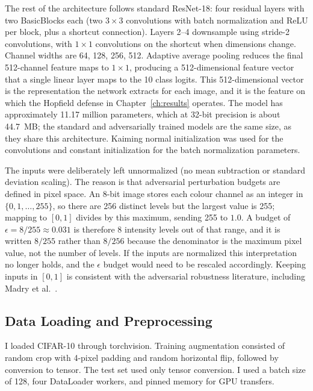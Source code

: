 The rest of the architecture follows standard ResNet-18: four residual layers with two BasicBlocks each (two $3 \times 3$ convolutions with batch normalization and ReLU per block, plus a shortcut connection). Layers 2--4 downsample using stride-2 convolutions, with $1 \times 1$ convolutions on the shortcut when dimensions change. Channel widths are 64, 128, 256, 512. Adaptive average pooling reduces the final 512-channel feature maps to $1 \times 1$, producing a 512-dimensional feature vector that a single linear layer maps to the 10 class logits. This 512-dimensional vector is the representation the network extracts for each image, and it is the feature on which the Hopfield defense in Chapter~\ref{ch:results} operates. The model has approximately 11.17 million parameters, which at 32-bit precision is about 44.7~MB; the standard and adversarially trained models are the same size, as they share this architecture. Kaiming normal initialization was used for the convolutions and constant initialization for the batch normalization parameters.

The inputs were deliberately left unnormalized (no mean subtraction or standard deviation scaling). The reason is that adversarial perturbation budgets are defined in pixel space. An 8-bit image stores each colour channel as an integer in $\{0, 1, \dots, 255\}$, so there are 256 distinct levels but the largest value is 255; mapping to $[0, 1]$ divides by this maximum, sending 255 to $1.0$. A budget of $\epsilon = 8/255 \approx 0.031$ is therefore 8 intensity levels out of that range, and it is written $8/255$ rather than $8/256$ because the denominator is the maximum pixel value, not the number of levels. If the inputs are normalized this interpretation no longer holds, and the $\epsilon$ budget would need to be rescaled accordingly. Keeping inputs in $[0, 1]$ is consistent with the adversarial robustness literature, including Madry et al.~\cite{madry2018towards}.

\subsection{Data Loading and Preprocessing}

I loaded CIFAR-10 through torchvision. Training augmentation consisted of random crop with 4-pixel padding and random horizontal flip, followed by conversion to tensor. The test set used only tensor conversion. I used a batch size of 128, four DataLoader workers, and pinned memory for GPU transfers.

